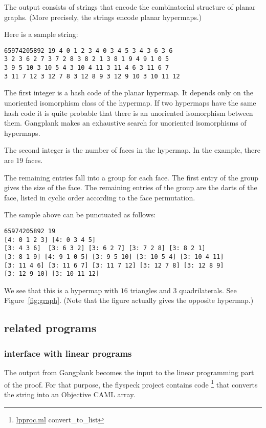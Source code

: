 The output consists of strings that encode the combinatorial structure of planar graphs.  (More precisely, the strings encode planar hypermaps.)

Here is a sample string:
\begin{verbatim}
65974205892 19 4 0 1 2 3 4 0 3 4 5 3 4 3 6 3 6 
3 2 3 6 2 7 3 7 2 8 3 8 2 1 3 8 1 9 4 9 1 0 5 
3 9 5 10 3 10 5 4 3 10 4 11 3 11 4 6 3 11 6 7 
3 11 7 12 3 12 7 8 3 12 8 9 3 12 9 10 3 10 11 12
\end{verbatim}

The first integer is a hash code of the planar hypermap.  It depends only on the
unoriented isomorphism class of the hypermap.  
If two hypermaps have the same hash code
it is quite probable that there is an unoriented isomorphism between them.
Gangplank 
makes an exhaustive search for unoriented isomorphisms of hypermaps.

The second integer is the number of faces in the hypermap.  In the example,
there are $19$ faces.

The remaining entries fall into a group for each face.  The first entry of the group
gives the size of the face.  The remaining entries of the group are the darts of
the face, listed in cyclic order according to the face permutation.

The sample above can be punctuated as follows:
\begin{verbatim}
65974205892 19 
[4: 0 1 2 3] [4: 0 3 4 5] 
[3: 4 3 6]  [3: 6 3 2] [3: 6 2 7] [3: 7 2 8] [3: 8 2 1] 
[3: 8 1 9] [4: 9 1 0 5] [3: 9 5 10] [3: 10 5 4] [3: 10 4 11] 
[3: 11 4 6] [3: 11 6 7] [3: 11 7 12] [3: 12 7 8] [3: 12 8 9] 
[3: 12 9 10] [3: 10 11 12]
\end{verbatim}
We see that this is a hypermap
with $16$ triangles and $3$ quadrilaterals.  See Figure~\ref{fig:graph}.
(Note that the figure actually gives the opposite hypermap.)




\subsection{related programs}


\subsubsection{interface with linear programs}

The output from Gangplank becomes the input to the linear programming
part of the proof.  For that purpose, the flyspeck project contains
code%
\footnote{\url{lpproc.ml}
  convert\_to\_list} %
that converts the string into an Objective CAML array.



